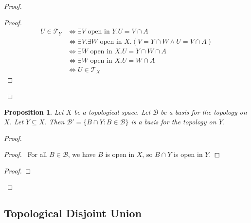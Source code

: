 \documentclass{book}
\let\qed\relax
\newtheorem{prop}[ax]{Proposition}
\theoremstyle{definition}
\begin{document}
\begin{proof}
\pf
{}
\begin{proof}
	\pf
	\begin{align*}
		U \in \mathcal{T}_Y & \Leftrightarrow \exists V \text{ open in } Y. U = V \cap A \\
		& \Leftrightarrow \exists V. \exists W \text{ open in } X. (V = Y \cap W \wedge U = V \cap A) \\
		& \Leftrightarrow \exists W \text{ open in } X. U = Y \cap W \cap A \\
		& \Leftrightarrow \exists W \text{ open in } X. U = W \cap A \\
		& \Leftrightarrow U \in \mathcal{T}_X
	\end{align*}
\end{proof}
\qed
\end{proof}

\begin{prop}
Let $X$ be a topological space. Let $\mathcal{B}$ be a basis for the topology on $X$. Let $Y \subseteq X$. Then $\mathcal{B}' = \{ B \cap Y : B \in \mathcal{B} \}$ is a basis for the topology on $Y$.
\end{prop}

\begin{proof}
\pf
{}
\begin{proof}
	\pf\ For all $B \in \mathcal{B}$, we have $B$ is open in $X$, so $B \cap Y$ is open in $Y$.
\end{proof}
\begin{proof}
\end{proof}
\qed
\end{proof}

\subsection{Topological Disjoint Union}
\end{document}
